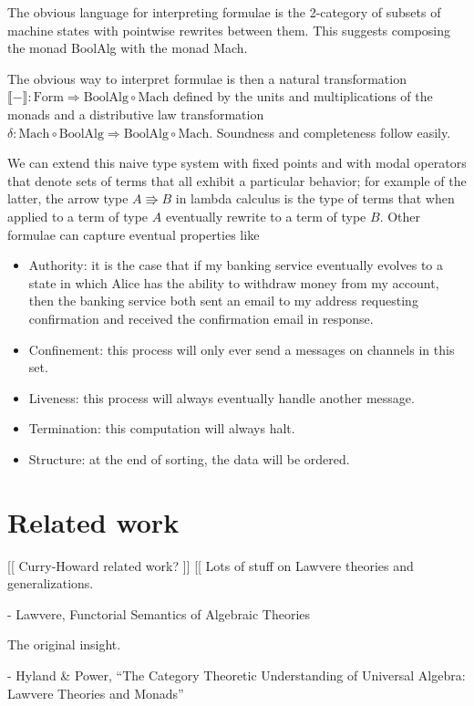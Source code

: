 \documentclass{article}
\newcommand{\interp}[1]{\llbracket #1 \rrbracket}
\newcommand{\maps}{\colon}
\newcommand{\Mach}{\mathrm{Mach}}
\newcommand{\BoolAlg}{\mathrm{BoolAlg}}
\newcommand{\Form}{\mathrm{Form}}
\begin{document}
  The obvious language for interpreting formulae is the 2-category of subsets of machine states with pointwise rewrites between them.  This suggests composing the monad BoolAlg with the monad Mach.

  The obvious way to interpret formulae is then a natural transformation $\interp{-} \maps \Form \Rightarrow \BoolAlg \circ \Mach$ defined by the units and multiplications of the monads and a distributive law transformation $\delta\maps \Mach \circ \BoolAlg \Rightarrow \BoolAlg \circ \Mach.$  Soundness and completeness follow easily.

  We can extend this naive type system with fixed points and with modal operators that denote sets of terms that all exhibit a particular behavior; for example of the latter, the arrow type $A \Rrightarrow B$ in lambda calculus is the type of terms that when applied to a term of type $A$ eventually rewrite to a term of type $B$.  Other formulae can capture eventual properties like
\begin{itemize}
  \item Authority: it is the case that if my banking service eventually evolves to a state in which Alice has the ability to withdraw money from my account, then the banking service both sent an email to my address requesting confirmation and received the confirmation email in response.
  \item Confinement: this process will only ever send a messages on channels in this set.
  \item Liveness: this process will always eventually handle another message.
  \item Termination: this computation will always halt.
  \item Structure: at the end of sorting, the data will be ordered.
\end{itemize}

\section{Related work}
[[ Curry-Howard related work? ]]
[[ Lots of stuff on Lawvere theories and generalizations.  

- Lawvere, Functorial Semantics of Algebraic Theories

The original insight.

- Hyland \& Power, ``The Category Theoretic Understanding of Universal Algebra: Lawvere Theories and Monads''
\end{document}
